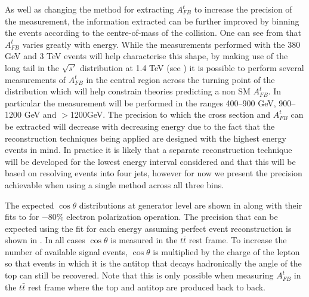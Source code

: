 As well as changing the method for extracting $A_{FB}^t$ to increase the precision of the measurement, the information extracted can be further improved by binning the events according to the centre-of-mass of the collision. One can see from  that $A_{FB}^t$ varies greatly with energy. While the measurements performed with the 380 GeV and 3 TeV events will help characterise this shape, by making use of the long tail in the $\sqrt{s'}$ distribution at 1.4 TeV (see ) it is possible to perform several measurements of $A_{FB}^t$ in the central region across the turning point of the distribution which will help constrain theories predicting a non \ac{SM} $A_{FB}^t$. In particular the measurement will be performed in the ranges 400--900 GeV, 900--1200 GeV and $>$1200GeV. The precision to which the cross section  and $A_{FB}^t$ can be extracted will decrease with decreasing energy due to the fact that the reconstruction techniques being applied are designed with the highest energy events in mind. In practice it is likely that a separate reconstruction technique will be developed for the lowest energy interval considered and that this will be based on resolving events into four jets, however for now we present the precision achievable when using a single method across all three bins. 


The expected $\cos\theta$ distributions at generator level are shown in  along with their fits to  for $-$80\% electron polarization operation. The precision that can be expected using the fit for each energy assuming perfect event reconstruction is shown in . In all cases $\cos\theta$ is measured in the $t\bar{t}$ rest frame. To increase the number of available signal events, $\cos\theta$ is multiplied by the charge of the lepton so that events in which it is the antitop that decays hadronically the angle of the top can still be recovered. Note that this is only possible when measuring $A_{FB}^t$ in the $t\bar{t}$ rest frame where the top and antitop are produced back to back.

